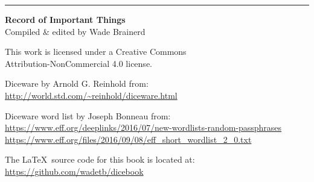 

\vfill
\rule{\textwidth}{.5pt}

\changepage{1em}{}{}{}{}{}{}{}{}

\textbf{Record of Important Things} \ccbync \\
\scriptsize
Compiled \& edited by Wade Brainerd

This work is licensed under a Creative Commons \\ Attribution-NonCommercial 4.0 license.


Diceware by Arnold G. Reinhold from: \\
\url{http://world.std.com/~reinhold/diceware.html}

Diceware word list by Joseph Bonneau from: \\ \url{https://www.eff.org/deeplinks/2016/07/new-wordlists-random-passphrases} \\
\url{https://www.eff.org/files/2016/09/08/eff_short_wordlist_2_0.txt}

The \LaTeX\ source code for this book is located at: \\ \url{https://github.com/wadetb/dicebook}

